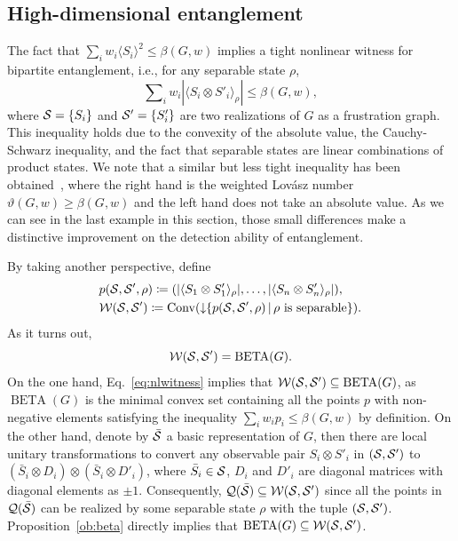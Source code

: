 \documentclass[
12pt,
prx,
aps,
reprint,
a4paper,
longbibliograph,
nofootinbib,
nobibnotes,
superscriptaddress
]{revtex4-2}
\theoremstyle{definition}
\def\conv{\mathrm{Conv}}
\def\be{\operatorname{BETA}}
\begin{document}
\subsection{High-dimensional entanglement}
The fact that $\sum_i w_i \langle S_i\rangle^2 \le \beta(G,w)$ implies a tight nonlinear witness for bipartite entanglement, i.e., for any separable state $\rho$,
\begin{equation}\label{eq:nlwitness}
	\sum\nolimits_i w_i |\langle S_i\otimes S'_i\rangle_{\rho}| \le  \beta(G,w),
\end{equation}
where ${\cal S} = \{S_i\}$ and ${\cal S}' = \{S'_i\}$ are two realizations of $G$ as a frustration graph.
This inequality holds due to the convexity of the absolute value, the Cauchy-Schwarz inequality, and the fact that separable states are linear combinations of product states. 
We note that a similar but less tight inequality has been obtained~\cite{de2023uncertainty}, where the right hand is the weighted Lov\'asz number~\cite{lovasz1979shannon} $\vartheta(G,w) \ge \beta(G,w)$ and the left hand does not take an absolute value. As we can see in the last example in this section, those small differences make a distinctive improvement on the detection ability of entanglement.

By taking another perspective, define
\begin{equation}
\begin{aligned}
	&p({\cal S}, {\cal S}', \rho) \coloneqq (|\langle S_1\otimes S'_1\rangle_{\rho}|, \ldots, |\langle S_n\otimes S'_n\rangle_{\rho}|),\\
	&{\cal W}({\cal S}, {\cal S}') \coloneqq \conv(\downarrow\hspace{-0.3em}\{p({\cal S}, {\cal S}', \rho) \,|\, \rho \text{ is separable}\}).
\end{aligned}
\end{equation}
As it turns out,
\begin{equation}\label{eq:entb}
{\cal W}({\cal S}, {\cal S}') = \be(G).
\end{equation}
On the one hand,  Eq.~\eqref{eq:nlwitness} implies that 
${\cal W}({\cal S}, {\cal S}') \subseteq \be(G)$,
as $\be(G)$ is the minimal convex set containing all the points $p$ with non-negative elements satisfying the inequality $\sum_i w_i p_i \le \beta(G,w)$ by definition.
On the other hand, denote by $\bar{\cal S}$ a basic representation of $G$, then there are local unitary transformations to convert any observable pair $S_i\otimes S'_i$ in $({\cal S}, {\cal S}')$ to $(\bar{S}_i\otimes D_i)\otimes(\bar{S}_i\otimes D'_i)$, where $\bar{S}_i \in {\cal S}$, $D_i$ and $D'_i$ are diagonal matrices with diagonal elements as $\pm 1$.
Consequently, ${\cal Q}(\bar{\cal S}) \subseteq {\cal W}({\cal S}, {\cal S}')$ since all the points in ${\cal Q}(\bar{\cal S})$ can be realized by some separable state $\rho$ with the tuple $({\cal S}, {\cal S}')$. Proposition~\ref{ob:beta} directly implies that $\be(G) \subseteq {\cal W}({\cal S}, {\cal S}')$.
\end{document}
